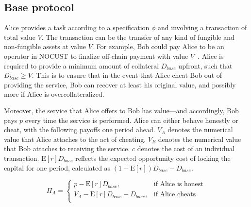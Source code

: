 \documentclass[runningheads]{llncs}
\newcommand{\rk}[1]{\todo[linecolor=red,backgroundcolor=red!25,bordercolor=blue,inline,caption={}]{Comment by Rami: #1}}
\newcommand{\dom}[1]{\todo[linecolor=green,backgroundcolor=green!25,bordercolor=green,inline,caption={}]{Comment by Dominik: #1}}
\begin{document}


\subsection{Base protocol}
Alice provides a task according to a specification $\phi$ and involving a transaction of total value $V$.
The transaction can be the transfer of any kind of fungible and non-fungible assets at value $V$.
For example, Bob could pay Alice to be an operator in NOCUST to finalize off-chain payment with value $V$~\cite{Khalil2019NOCUST}.
Alice is required to provide a minimum amount of collateral $D_{base}$ upfront, such that $D_{base} \geq V$.
This is to ensure that in the event that Alice cheat Bob out of providing the service, Bob can recover at least his original value, and possibly more if Alice is overcollateralized.

Moreover, the service that Alice offers to Bob has value---and accordingly, Bob pays $p$ every time the service is performed.
Alice can either behave honestly or cheat, with the following payoffs one period ahead.
$V_A$ denotes the numerical value that Alice attaches to the act of cheating.
$V_B$ denotes the numerical value that Bob attaches to receiving the service.
$c$ denotes the cost of an individual transaction. 
$\mathrm{E}[r]D_{base}$ reflects the expected opportunity cost of locking the capital for one period, calculated as $(1+\mathrm{E}[r])D_{base}-D_{base}$.


\begin{equation}
\label{eq:status-quo_alice}
\Pi_A = 
\begin{cases}
    p - \mathrm{E}[r]D_{base}, & \text{if Alice is honest} \\
    V_A - \mathrm{E}[r]D_{base}-D_{base}, & \text{if Alice cheats} \\
\end{cases}
\end{equation}


\end{document}
